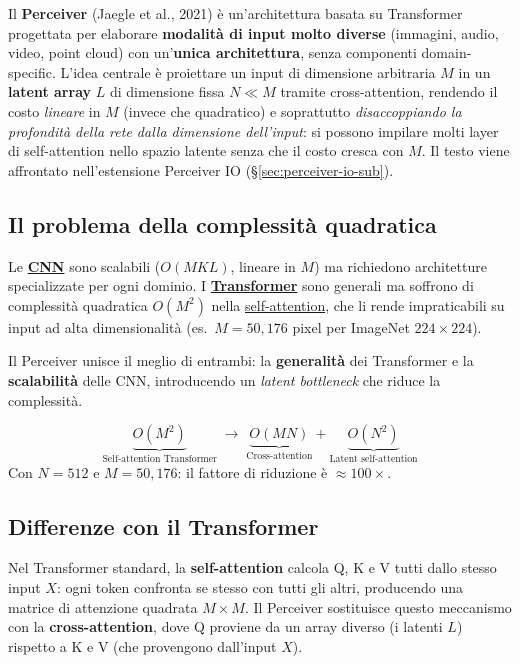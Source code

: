 \documentclass[
  11pt,
]{article}
\begin{document}
Il \textbf{Perceiver} (Jaegle et al., 2021) è un'architettura basata su Transformer progettata per elaborare \textbf{modalità di input molto diverse} (immagini, audio, video, point cloud) con un'\textbf{unica architettura}, senza componenti domain-specific. L'idea centrale è proiettare un input di dimensione arbitraria $M$ in un \textbf{latent array} $L$ di dimensione fissa $N \ll M$ tramite cross-attention, rendendo il costo \emph{lineare} in $M$ (invece che quadratico) e soprattutto \emph{disaccoppiando la profondità della rete dalla dimensione dell'input}: si possono impilare molti layer di self-attention nello spazio latente senza che il costo cresca con $M$. Il testo viene affrontato nell'estensione Perceiver IO (\S\ref{sec:perceiver-io-sub}).

\subsection{Il problema della complessità quadratica}

Le \hyperref[app:cnn]{\textbf{CNN}} sono scalabili ($O(MKL)$, lineare in $M$) ma richiedono architetture specializzate per ogni dominio. I \hyperref[app:transformer]{\textbf{Transformer}} sono generali ma soffrono di complessità quadratica $O(M^2)$ nella \hyperref[app:self-vs-cross]{self-attention}, che li rende impraticabili su input ad alta dimensionalità (es.\ $M = 50{,}176$ pixel per ImageNet $224 \times 224$).

Il Perceiver unisce il meglio di entrambi: la \textbf{generalità} dei Transformer e la \textbf{scalabilità} delle CNN, introducendo un \emph{latent bottleneck} che riduce la complessità.

\begin{formulabox}[title={\textbf{Riduzione della complessità}}]
\[
\underbrace{O(M^2)}_{\text{Self-attention Transformer}} \;\longrightarrow\; \underbrace{O(MN)}_{\text{Cross-attention}} + \underbrace{O(N^2)}_{\text{Latent self-attention}}
\]
Con $N = 512$ e $M = 50{,}176$: il fattore di riduzione è $\approx 100\times$.
\end{formulabox}

\clearpage
\subsection{Differenze con il Transformer}
\label{sec:diff-transformer}

Nel Transformer standard, la \textbf{self-attention} calcola Q, K e V tutti dallo stesso input $X$: ogni token confronta se stesso con tutti gli altri, producendo una matrice di attenzione quadrata $M \times M$. Il Perceiver sostituisce questo meccanismo con la \textbf{cross-attention}, dove Q proviene da un array diverso (i latenti $L$) rispetto a K e V (che provengono dall'input $X$).
\end{document}
